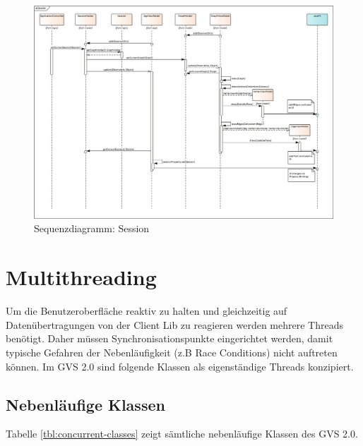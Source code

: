 \documentclass[11pt,a4paper,english,oneside]{book}
\numberwithin{equation}{chapter}
\begin{document}
	\begin{figure}[h!]
		\centering
		\includegraphics[width=\linewidth]{assets/images/sequence_Session}
		\caption{Sequenzdiagramm: Session}
		\label{fig:sd-session-2}
	\end{figure}

	\clearpage


	\section{Multithreading} \label{sec:threading}
	Um die Benutzeroberfläche reaktiv zu halten und gleichzeitig auf Datenübertragungen von der Client Lib zu reagieren werden mehrere Threads benötigt. Daher müssen Synchronisationspunkte eingerichtet werden, damit typische Gefahren der Nebenläufigkeit (z.B Race Conditions) nicht auftreten können. Im GVS 2.0 sind folgende Klassen als eigenständige Threads konzipiert.
	
	\subsection{Nebenläufige Klassen}
	Tabelle \ref{tbl:concurrent-classes} zeigt sämtliche nebenläufige Klassen des GVS 2.0.
	
\end{document}
